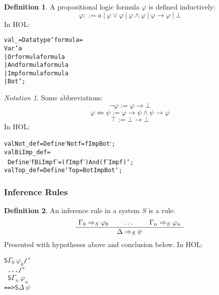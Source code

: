 \documentclass[english,svgnames,hide notes,12pt]{beamer}
\theoremstyle{definition}
\newtheorem{defn}{Definition}
\theoremstyle{remark}
\newtheorem{notn}{Notation}
\begin{document}
\begin{frame}
    \begin{defn}
        A propositional logic formula $\varphi$ is defined inductively:
        \[ \varphi ::= a ~|~ \varphi \lor \varphi ~|~ \varphi \land \varphi ~|~ \varphi \to \varphi ~|~ \bot \]
    In HOL:
    \begin{alltt}
        val _ = Datatype `formula =\\
        Var 'a\\
        | Or formula formula\\
        | And formula formula\\
        | Imp formula formula\\
        | Bot`;
    \end{alltt}
    \end{defn}
\end{frame}
\begin{frame}
    \begin{notn}
    Some abbreviations: 
        \[ \neg \varphi := \varphi \to \bot \]
        \[ \varphi \Leftrightarrow \psi := \varphi \to \psi \land \psi \to \varphi \]
        \[ \top := \bot \to \bot \]
        In HOL:
        \begin{alltt}
            val Not_def = Define `Not f = f Imp Bot`;\\
            val BiImp_def = \\
            ~Define `f BiImp f' = (f Imp f') And (f' Imp f)`;\\
            val Top_def = Define `Top = Bot Imp Bot`;\\
        \end{alltt}
    \end{notn}
\end{frame}

\begin{frame}
    \frametitle{Inference Rules}
    \begin{defn}
        An inference rule in a system $S$ is a rule:
        \[
            \AxiomC{$\Gamma_0 \Rightarrow_S \varphi_0$}
            \AxiomC{$\dots$}
            \AxiomC{$\Gamma_n \Rightarrow_S \varphi_n$}  
            \TrinaryInfC{$\Delta \Rightarrow_S \psi$}
            \DisplayProof
        \]
        Presented with hypotheses above and conclusion below.
        In HOL:
        \begin{alltt}
            % !$\Gamma_0$ ... $\Gamma_n$ $\Delta$ $\varphi_0$ ... $\varphi_n$ $\psi$. 
            S $\Gamma_0 ~ \varphi_0$ /\char`\\\ ... /\char`\\\ S $\Gamma_n ~ \varphi_n$ 
            ==> S $\Delta ~ \psi$
        \end{alltt}
    \end{defn}
\end{frame}
\end{document}
